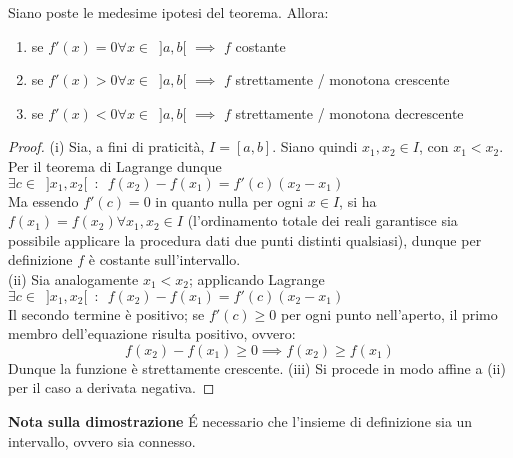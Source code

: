 \documentclass[10pt]{article}
\theoremstyle{plain}
\begin{document}
\begin{cor}
\label{corlagrange}
Siano poste le medesime ipotesi del teorema. Allora:
\begin{enumerate}[label=$\square$]
    \item se $f'(x) = 0 \forall x \in \enspace ]a, b[$ $\implies$ $f$ costante
    \item se $f'(x) > 0 \forall x \in \enspace ]a, b[$ $\implies$ $f$ strettamente / monotona crescente
    \item se $f'(x) < 0 \forall x \in \enspace ]a, b[$ $\implies$ $f$ strettamente / monotona decrescente
\end{enumerate}
\end{cor}
\begin{proof}
(i) Sia, a fini di praticità, $I = [a, b]$. Siano quindi $x_1, x_2 \in I$, con $x_1 < x_2$. Per il teorema di Lagrange dunque $\exists c \in \enspace ]x_1, x_2[ \enspace : \enspace f(x_2) - f(x_1) = f'(c)(x_2 - x_1)$\\
Ma essendo $f'(c) = 0$ in quanto nulla per ogni $x \in I$, si ha $f(x_1) = f(x_2) \forall x_1, x_2 \in I$ (l'ordinamento totale dei reali garantisce sia possibile applicare la procedura dati due punti distinti qualsiasi), dunque per definizione $f$ è costante sull'intervallo.\\
(ii) Sia analogamente $x_1 < x_2$; applicando Lagrange $\exists c \in \enspace ]x_1, x_2[ \enspace : \enspace f(x_2) - f(x_1) = f'(c)(x_2 - x_1)$\\
Il secondo termine è positivo; se $f'(c) \geq 0$ per ogni punto nell'aperto, il primo membro dell'equazione risulta positivo, ovvero:
\[f(x_2) - f(x_1) \geq 0 \implies f(x_2) \geq f(x_1)\]
Dunque la funzione è strettamente crescente.
(iii) Si procede in modo affine a (ii) per il caso a derivata negativa.
\end{proof}
\textbf{Nota sulla dimostrazione} \'E necessario che l'insieme di definizione sia un intervallo, ovvero sia connesso.
\end{document}
